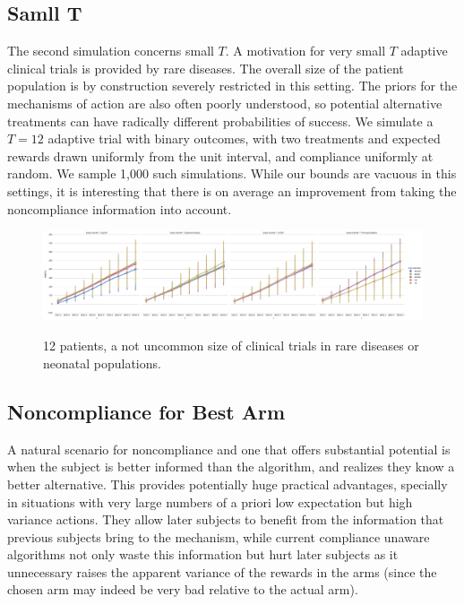 \subsection{Samll T}

The second simulation concerns small $T$. A motivation for very small $T$ adaptive clinical trials is provided by rare diseases. The overall size of the patient population is by construction severely restricted in this setting.  The priors for the mechanisms of action are also often poorly understood, so potential alternative treatments can have radically different probabilities of success. We simulate a $T=12$ adaptive trial with binary outcomes, with two treatments and expected rewards drawn uniformly from the unit interval, and compliance uniformly at random. We sample 1,000 such simulations.
While our bounds are vacuous in this settings, it is interesting that there is on average an  improvement from taking the noncompliance information into account.


\begin{figure}[t]
	\centering	
	\includegraphics[width=1\textwidth, angle=90]{bandit/figs/ex3.png}\hspace{1cm}
	\label{fig:ex3}
	\caption{12 patients, a not uncommon size of clinical trials in rare diseases or neonatal populations.}
\end{figure}





\subsection{Noncompliance for Best Arm}


A natural scenario for noncompliance and one that offers substantial potential is when the subject is better informed than the algorithm, and realizes they know a better alternative. 
This provides potentially huge practical advantages, specially in situations with very large numbers of a priori low expectation but high variance actions. 
They allow later subjects to benefit from the information that previous subjects bring to the mechanism, while current compliance unaware algorithms not only waste this information but hurt later subjects as it unnecessary raises the apparent variance of the rewards in the arms (since the chosen arm may indeed be very bad relative to the actual arm).





